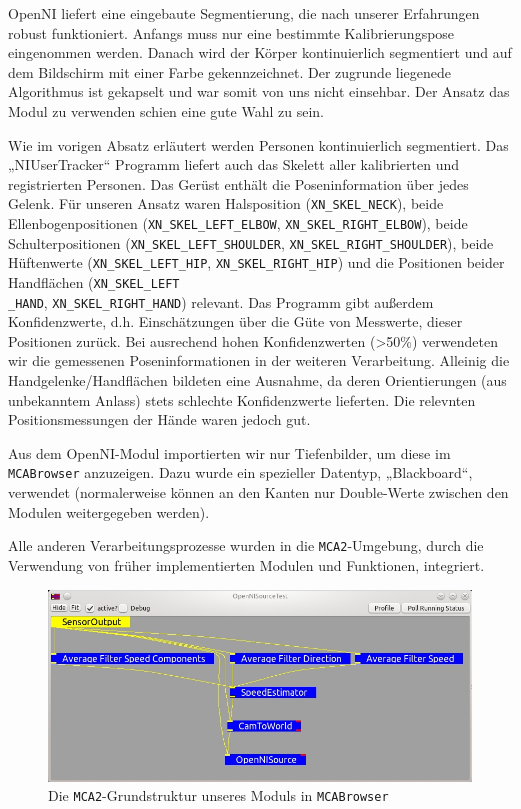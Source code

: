 OpenNI liefert eine eingebaute Segmentierung, die nach unserer Erfahrungen robust funktioniert.
 Anfangs muss nur eine bestimmte Kalibrierungspose eingenommen werden. Danach wird der Körper kontinuierlich segmentiert und
 auf dem Bildschirm mit einer Farbe gekennzeichnet. Der zugrunde liegenede Algorithmus ist gekapselt und war somit von uns nicht einsehbar.
 Der Ansatz das Modul zu verwenden schien eine gute Wahl zu sein.

Wie im vorigen Absatz erläutert werden Personen kontinuierlich segmentiert. Das
„NIUserTracker“ Programm liefert auch das Skelett aller kalibrierten und registrierten Personen. Das Gerüst enthält die Poseninformation über jedes
 Gelenk. Für unseren Ansatz waren Halsposition (\lstinline{XN_SKEL_NECK}), beide
 Ellenbogenpositionen (\lstinline{XN_SKEL_LEFT_ELBOW},
 \lstinline{XN_SKEL_RIGHT_ELBOW}), beide Schulterpositionen
 (\lstinline{XN_SKEL_LEFT_SHOULDER}, \lstinline{XN_SKEL_RIGHT_SHOULDER}), beide
 Hüftenwerte (\lstinline{XN_SKEL_LEFT_HIP}, \lstinline{XN_SKEL_RIGHT_HIP}) und
 die Positionen beider Handflächen (\lstinline{XN_SKEL_LEFT}\\\lstinline{_HAND},
 \lstinline{XN_SKEL_RIGHT_HAND}) relevant. Das Programm gibt außerdem
 Konfidenzwerte, d.h. Einschätzungen über die Güte von Messwerte, dieser Positionen zurück.
 Bei ausrechend hohen Konfidenzwerten (>50\%) verwendeten wir die gemessenen
 Poseninformationen in der weiteren Verarbeitung. Alleinig die Handgelenke/Handflächen bildeten eine Ausnahme,
 da deren Orientierungen (aus unbekanntem Anlass) stets schlechte Konfidenzwerte lieferten. Die relevnten Positionsmessungen der Hände waren jedoch gut.

Aus dem OpenNI-Modul importierten wir nur Tiefenbilder, um diese im
\lstinline{MCABrowser} anzuzeigen. Dazu wurde ein spezieller Datentyp,
„Blackboard“, verwendet (normalerweise können an den Kanten nur Double-Werte zwischen den Modulen weitergegeben werden).

Alle anderen Verarbeitungsprozesse wurden in die \lstinline{MCA2}-Umgebung,
durch die Verwendung von früher implementierten Modulen und Funktionen, integriert.

\begin{figure}[h]
\center
\includegraphics[scale=0.5]{graphics/OpenNISourceTest.jpg}
\caption{\label{fig:OpenNISourceTest} Die \lstinline{MCA2}-Grundstruktur
unseres Moduls in \lstinline{MCABrowser}}
\end{figure}

